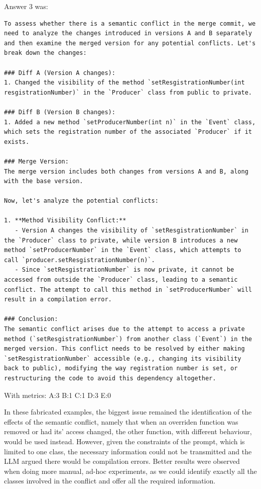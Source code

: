 Answer 3 was:
\begin{lstlisting}
To assess whether there is a semantic conflict in the merge commit, we need to analyze the changes introduced in versions A and B separately and then examine the merged version for any potential conflicts. Let's break down the changes:

### Diff A (Version A changes):
1. Changed the visibility of the method `setResgistrationNumber(int resgistrationNumber)` in the `Producer` class from public to private.

### Diff B (Version B changes):
1. Added a new method `setProducerNumber(int n)` in the `Event` class, which sets the registration number of the associated `Producer` if it exists.

### Merge Version:
The merge version includes both changes from versions A and B, along with the base version.

Now, let's analyze the potential conflicts:

1. **Method Visibility Conflict:**
   - Version A changes the visibility of `setResgistrationNumber` in the `Producer` class to private, while version B introduces a new method `setProducerNumber` in the `Event` class, which attempts to call `producer.setResgistrationNumber(n)`.
   - Since `setResgistrationNumber` is now private, it cannot be accessed from outside the `Producer` class, leading to a semantic conflict. The attempt to call this method in `setProducerNumber` will result in a compilation error.

### Conclusion:
The semantic conflict arises due to the attempt to access a private method (`setResgistrationNumber`) from another class (`Event`) in the merged version. This conflict needs to be resolved by either making `setResgistrationNumber` accessible (e.g., changing its visibility back to public), modifying the way registration number is set, or restructuring the code to avoid this dependency altogether.
\end{lstlisting}

With metrics:
A:3
B:1
C:1
D:3
E:0

In these fabricated examples, the biggest issue remained the identification of the effects of the semantic conflict, namely that when an overriden function was removed or had its' access changed, the other function, with different behaviour, would be used instead. However, given the constraints of the prompt, which is limited to one class, the necessary information could not be transmitted and the LLM argued there would be compilation errors. Better results were observed when doing more manual, ad-hoc experiments, as we could identify exactly all the classes involved in the conflict and offer all the required information.

